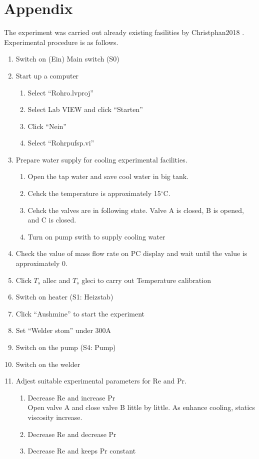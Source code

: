 \documentclass[conference]{IEEEtran}
\begin{document}
\section{Appendix}
The experiment was carried out already existing fasilities by Christphan2018 \cite{Christphan2018}.
Experimental procedure is as follows.
\begin{enumerate}
  \item Switch on (Ein) Main switch (S0)
  \item Start up a computer
  \begin{enumerate}
      \item Select ``Rohro.lvproj''
      \item Select Lab VIEW and click ``Starten''
      \item Click ``Nein''
      \item Select ``Rohrpufsp.vi''
  \end{enumerate}
  \item Prepare water supply for cooling experimental facilities.
  \begin{enumerate}
      \item Open the tap water and save cool water in big tank.
      \item Cehck the temperature is approximately 15$^\circ$C.
      \item Cehck the valves are in following state.
      Valve A is closed, B is opened, and C is closed.
      \item Turn on pump swith to supply cooling water
  \end{enumerate}
  \item Check the value of mass flow rate on PC display and wait until the value is approximately 0.
  \item Click $T_{s}$ allec and $T_{s}$ gleci to carry out Temperature calibration
  \item Switch on heater (S1: Heizstab)
  \item Click ``Aushmine'' to start the experiment
  \item Set ``Welder stom'' under 300A
  \item Switch on the pump (S4: Pump)
  \item Switch on the welder
  \item Adjest suitable experimental parameters for Re and Pr.
  \begin{enumerate}
      \item Decrease Re and increase Pr\\
      Open valve A and close valve B little by little.
      As enhance cooling, statics viscosity increase.
      \item Decrease Re and decrease Pr
      \item Decrease Re and keeps Pr constant


\end{enumerate}
\end{enumerate}
\end{document}
